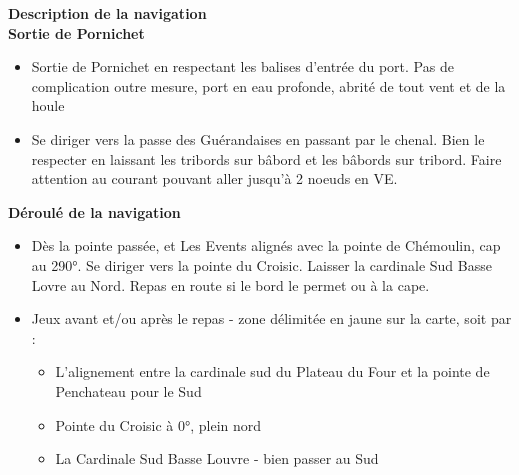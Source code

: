 \begin{minipage}[c][\textheight][t]{0.10\textwidth}
\hfill
\end{minipage}%
\begin{minipage}[c][\textheight][t]{0.50\textwidth}
    \vspace{2cm}
    \color{StrongBlue}    
    {\huge \textbf{Description de la navigation}}\\
        {\large \textbf{Sortie de Pornichet}}\\
            \begin{itemize}
                \item Sortie de Pornichet en respectant les balises d’entrée du port. Pas de complication outre mesure, port en eau profonde, abrité de tout vent et de la houle
                \item Se diriger vers la passe des Guérandaises en passant par le chenal. Bien le respecter en laissant les tribords sur bâbord et les bâbords sur tribord. Faire attention au courant pouvant aller jusqu’à 2 noeuds en VE.
            \end{itemize}
        {\large \textbf{Déroulé de la navigation}}\\
            \begin{itemize} 
                \item Dès la pointe passée, et Les Events alignés avec la pointe de Chémoulin, cap au 290°. Se diriger vers la pointe du Croisic. Laisser la cardinale Sud Basse Lovre au Nord. Repas en route si le bord le permet ou à la cape.
                \item Jeux avant et/ou après le repas - zone délimitée en jaune sur la carte, soit par : 
                    \begin{itemize}
                        \item L’alignement entre la cardinale sud du Plateau du Four et la pointe de Penchateau pour le Sud
                        \item Pointe du Croisic à 0°, plein nord
                        \item La Cardinale Sud Basse Louvre - bien passer au Sud
                    \end{itemize}


\end{itemize}
\end{minipage}
